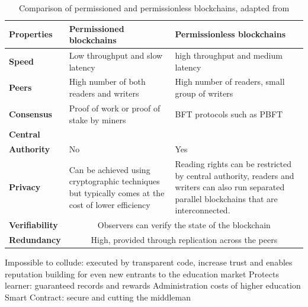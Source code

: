 \begin{table}[!h] 
    \caption{Comparison of permissioned and permissionless blockchains, adapted from \citet[p.3]{wust2017you}}
    \centering
    \label{table:permvsless}
    \begin{tabularx}{\textwidth}{>{\bfseries}lXX}
        Properties & Permissioned blockchains & Permissionless blockchains\\
        \toprule
        Speed & Low throughput and slow latency & high throughput and medium latency\\\midrule
        Peers & High number of both readers and writers & High number of readers, small group of writers\\\midrule
        Consensus & Proof of work or proof of stake by miners & BFT protocols such as PBFT\\\midrule
        Central\\Authority & No & Yes\\\midrule
        Privacy & Can be achieved using cryptographic techniques but typically comes at the cost of lower efficiency & 
        Reading rights can be restricted by central authority, readers and writers can also run separated parallel blockchains that are interconnected. \\\midrule
        Verifiability & \multicolumn{2}{c}{Observers can verify the state of the blockchain} \\\midrule
        Redundancy & \multicolumn{2}{c}{High, provided through replication across the peers}
        \\\bottomrule
    \end{tabularx}
\end{table}



Impossible to collude: executed by transparent code, increase trust and enables reputation building for even new entrants to 
the education market
Protects learner: guaranteed records and rewards
Administration costs of higher education
Smart Contract: secure and cutting the middleman

  

